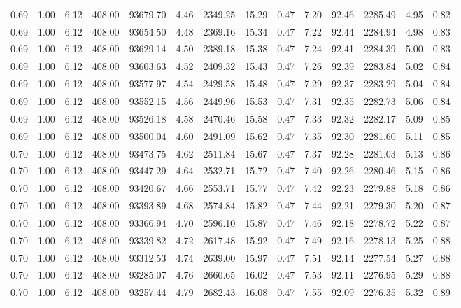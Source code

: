 \begin{table}[!ht]
\begin{tabular}{rrrrrrrrrrrrrr}
0.69 & 1.00 & 6.12 & 408.00 & 93679.70 & 4.46 & 2349.25 & 15.29 & 0.47 & 7.20 & 92.46 & 2285.49 & 4.95 & 0.82 \\
0.69 & 1.00 & 6.12 & 408.00 & 93654.50 & 4.48 & 2369.16 & 15.34 & 0.47 & 7.22 & 92.44 & 2284.94 & 4.98 & 0.83 \\
0.69 & 1.00 & 6.12 & 408.00 & 93629.14 & 4.50 & 2389.18 & 15.38 & 0.47 & 7.24 & 92.41 & 2284.39 & 5.00 & 0.83 \\
0.69 & 1.00 & 6.12 & 408.00 & 93603.63 & 4.52 & 2409.32 & 15.43 & 0.47 & 7.26 & 92.39 & 2283.84 & 5.02 & 0.84 \\
0.69 & 1.00 & 6.12 & 408.00 & 93577.97 & 4.54 & 2429.58 & 15.48 & 0.47 & 7.29 & 92.37 & 2283.29 & 5.04 & 0.84 \\
0.69 & 1.00 & 6.12 & 408.00 & 93552.15 & 4.56 & 2449.96 & 15.53 & 0.47 & 7.31 & 92.35 & 2282.73 & 5.06 & 0.84 \\
0.69 & 1.00 & 6.12 & 408.00 & 93526.18 & 4.58 & 2470.46 & 15.58 & 0.47 & 7.33 & 92.32 & 2282.17 & 5.09 & 0.85 \\
0.69 & 1.00 & 6.12 & 408.00 & 93500.04 & 4.60 & 2491.09 & 15.62 & 0.47 & 7.35 & 92.30 & 2281.60 & 5.11 & 0.85 \\
0.70 & 1.00 & 6.12 & 408.00 & 93473.75 & 4.62 & 2511.84 & 15.67 & 0.47 & 7.37 & 92.28 & 2281.03 & 5.13 & 0.86 \\
0.70 & 1.00 & 6.12 & 408.00 & 93447.29 & 4.64 & 2532.71 & 15.72 & 0.47 & 7.40 & 92.26 & 2280.46 & 5.15 & 0.86 \\
0.70 & 1.00 & 6.12 & 408.00 & 93420.67 & 4.66 & 2553.71 & 15.77 & 0.47 & 7.42 & 92.23 & 2279.88 & 5.18 & 0.86 \\
0.70 & 1.00 & 6.12 & 408.00 & 93393.89 & 4.68 & 2574.84 & 15.82 & 0.47 & 7.44 & 92.21 & 2279.30 & 5.20 & 0.87 \\
0.70 & 1.00 & 6.12 & 408.00 & 93366.94 & 4.70 & 2596.10 & 15.87 & 0.47 & 7.46 & 92.18 & 2278.72 & 5.22 & 0.87 \\
0.70 & 1.00 & 6.12 & 408.00 & 93339.82 & 4.72 & 2617.48 & 15.92 & 0.47 & 7.49 & 92.16 & 2278.13 & 5.25 & 0.88 \\
0.70 & 1.00 & 6.12 & 408.00 & 93312.53 & 4.74 & 2639.00 & 15.97 & 0.47 & 7.51 & 92.14 & 2277.54 & 5.27 & 0.88 \\
0.70 & 1.00 & 6.12 & 408.00 & 93285.07 & 4.76 & 2660.65 & 16.02 & 0.47 & 7.53 & 92.11 & 2276.95 & 5.29 & 0.88 \\
0.70 & 1.00 & 6.12 & 408.00 & 93257.44 & 4.79 & 2682.43 & 16.08 & 0.47 & 7.55 & 92.09 & 2276.35 & 5.32 & 0.89 \\

\end{tabular}
\end{table}
